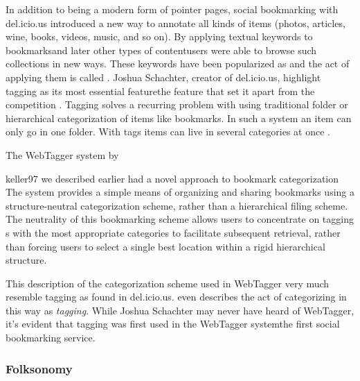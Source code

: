 In addition to being a modern form of pointer pages, social bookmarking
with del.icio.us introduced a new way to annotate all kinds of
items (photos, articles, wine, books, videos, music, and so on).
By applying textual keywords to
bookmarks\dash{}and later other types of content\dash{}users were able to
browse such collections in new ways. These keywords have been popularized as
 and the act of applying them is called .%
Joshua Schachter, creator of del.icio.us, highlight tagging as its most
essential feature\dash{}the feature that set it apart from the competition
\cite[]{livingston07}. Tagging solves a recurring problem with
using traditional folder or hierarchical categorization of items like
bookmarks. In such a system an item can only go in one folder. With
tags items can live in several categories at once
\citep[]{weinberger07}.

The WebTagger system by
\begin{fullquote}[\p{1109}]{keller97}{%
  we described earlier had a novel approach to bookmark categorization}
    The system provides a simple means of organizing and sharing bookmarks
    using a structure-neutral categorization scheme, rather than a
    hierarchical filing scheme. The neutrality of this bookmarking scheme
    allows users to concentrate on tagging s with the most
    appropriate categories to facilitate subsequent retrieval, rather than
    forcing users to select a single best location within a rigid hierarchical
    structure.
\end{fullquote}

This description of the categorization scheme used in WebTagger very much
resemble tagging as found in del.icio.us. \citeauthor{keller97} even describes
the act of categorizing in this way as \emph{tagging}. While Joshua Schachter
may never have heard of WebTagger, it's evident that tagging was first used in
the WebTagger system\dash{}the first social bookmarking service.

\subsubsection{Folksonomy}


